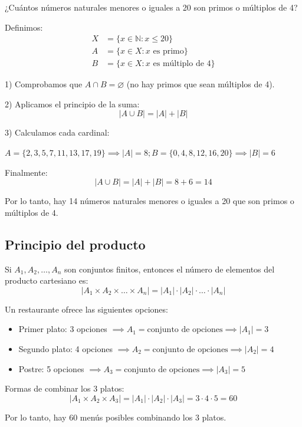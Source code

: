 \documentclass[a4paper,12pt]{article}
\begin{document}
\begin{ejemplo}[title=Ejemplo: Principio de la suma]
¿Cuántos números naturales menores o iguales a 20 son primos o múltiplos de 4?  

Definimos:
\begin{align*}
X &= \{ x \in \mathbb{N} : x \le 20 \} \\
A &= \{ x \in X : x \text{ es primo} \} \\
B &= \{ x \in X : x \text{ es múltiplo de 4} \}
\end{align*}

1) Comprobamos que $A \cap B = \varnothing$ (no hay primos que sean múltiplos de 4).  

2) Aplicamos el principio de la suma:
\[
|A \cup B| = |A| + |B|
\]

3) Calculamos cada cardinal:

$A = \{2,3,5,7,11,13,17,19\} \implies |A| = 8; B = \{0,4,8,12,16,20\} \implies |B| = 6$

Finalmente:
\[
|A \cup B| = |A| + |B| = 8 + 6 = 14
\]

Por lo tanto, hay 14 números naturales menores o iguales a 20 que son primos o múltiplos de 4.
\end{ejemplo}

\subsection{Principio del producto}

\begin{procedimiento}[title=Principio del producto]
Si $A_1, A_2, \dots, A_n$ son conjuntos finitos, entonces el número de elementos del producto cartesiano es:
\[
|A_1 \times A_2 \times \dots \times A_n| = |A_1| \cdot |A_2| \cdot \dots \cdot |A_n|
\]
\end{procedimiento}

\begin{ejemplo}[title=Ejemplo: Principio del producto]
Un restaurante ofrece las siguientes opciones:

\begin{itemize}
    \item Primer plato: 3 opciones $\implies A_1 = \text{conjunto de  opciones} \implies |A_1| = 3$
    \item Segundo plato: 4 opciones $\implies A_2 = \text{conjunto de  opciones} \implies |A_2| = 4$
    \item Postre: 5 opciones $\implies A_3 = \text{conjunto de  opciones} \implies |A_3| = 5$
\end{itemize}

Formas de combinar los 3 platos:
\[
|A_1 \times A_2 \times A_3| = |A_1| \cdot |A_2| \cdot |A_3| = 3 \cdot 4 \cdot 5 = 60
\]

Por lo tanto, hay 60 menús posibles combinando los 3 platos.
\end{ejemplo}
\end{document}
